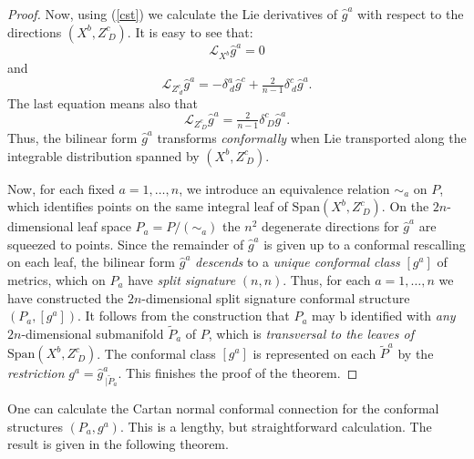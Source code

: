 \documentclass[letterpaper]{amsart}
\theoremstyle{definition}
\theoremstyle{remark}
\newcommand{\Span}{\mathrm{Span}}
\begin{document}
\begin{proof}
Now, using (\ref{cst}) we calculate the Lie derivatives of $\hat{g}^a$
with respect to the directions $(X^b,Z^c_{~D})$. It is easy to see
that:
$${\mathcal L}_{X^b}\hat{g}^a=0$$
and 
$${\mathcal
  L}_{Z^c_{~d}}\hat{g}^a=-\delta^a_{~d}\hat{g}^c+\tfrac{2}{n-1}\delta^c_{~d}\hat{g}^a.$$
The last equation means also that
$${\mathcal
  L}_{Z^c_{~D}}\hat{g}^a=\tfrac{2}{n-1}\delta^c_{~D}\hat{g}^a.$$
Thus, the bilinear form $\hat{g}^a$ transforms \emph{conformally} when
Lie transported along the integrable distribution spanned by
$(X^b,Z^c_{~D})$. 

Now, for each fixed $a=1,\dots,n$, we introduce an equivalence
relation $\sim_a$ on $P$, which identifies points on
the same integral leaf of $\Span(X^b,Z^c_{~D})$. On the
$2n$-dimensional leaf space $P_a=P/{(\sim_a)}$ the $n^2$ degenerate
directions for $\hat{g}^a$ are squeezed to points. Since the remainder
of $\hat{g}^a$ is given up to a conformal rescalling on each leaf,
the bilinear form $\hat{g}^a$ \emph{descends} to a \emph{unique conformal
class} $[g^a]$ of metrics, which on $P_a$ have \emph{split signature}
$(n,n)$. Thus, for each $a=1,\dots,n$ we have constructed the
$2n$-dimensional split signature conformal structure
$(P_a,[g^a])$. It follows from the construction that $P_a$ may b
identified with \emph{any} $2n$-dimensional submanifold $\tilde{P}_a$
of $P$, which is \emph{transversal to the leaves of}
$\Span(X^b,Z^c_{~D})$. The conformal class $[g^a]$ is represented on
each $\tilde{P}^a$ by the \emph{restriction}
$g^a=\hat{g}^a_{~|\tilde{P}_a}$. This finishes the proof of the theorem.
\end{proof}
One can calculate the Cartan normal conformal connection for the
conformal structures  $(P_a,g^a)$. This is a lengthy, but
straightforward calculation. The result is given in the following
theorem.
\end{document}
